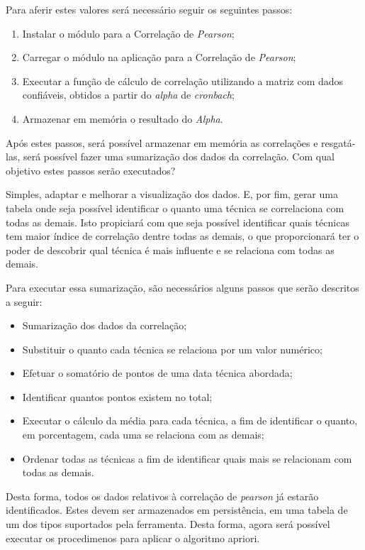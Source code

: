 Para aferir estes valores será necessário seguir os seguintes passos:

\begin{enumerate}
    \item Instalar o módulo para a Correlação de \textit{Pearson};
    \item Carregar o módulo  na aplicação para a Correlação de \textit{Pearson};
    \item Executar a função de cálculo de correlação utilizando a matriz com dados confiáveis, obtidos a partir do \textit{alpha} de \textit{cronbach};
    \item Armazenar em memória o resultado do \textit{Alpha}.
\end{enumerate}

Após estes passos, será possível armazenar em memória as correlações e resgatá-las, será possível fazer uma sumarização dos dados
da correlação. Com qual objetivo estes passos serão executados?

Simples, adaptar e melhorar a visualização dos dados. E, por fim, gerar uma tabela onde seja possível identificar o quanto uma técnica
se correlaciona com todas as demais. Isto propiciará com que seja possível identificar quais técnicas tem maior índice de correlação
dentre todas as demais, o que proporcionará ter o poder de descobrir qual técnica é mais influente e se relaciona com todas as demais.


Para executar essa sumarização, são necessários alguns passos que serão descritos a seguir:

\begin{itemize}
    \item Sumarização dos dados da correlação;
    \item Substituir o quanto cada técnica se relaciona por um valor numérico;
    \item Efetuar o somatório de pontos de uma data técnica abordada;
    \item Identificar quantos pontos existem no total;
    \item Executar o cálculo da média para cada técnica, a fim de identificar o quanto, em porcentagem, cada uma
        se relaciona com as demais;
    \item Ordenar todas as técnicas a fim de identificar quais mais se relacionam com todas as demais.
\end{itemize}

Desta forma, todos os dados relativos à correlação de \textit{pearson} já estarão identificados. Estes devem ser armazenados em persistência,
em uma tabela de um dos tipos suportados pela ferramenta. Desta forma, agora será possível executar os procedimenos para aplicar
o algoritmo apriori.

